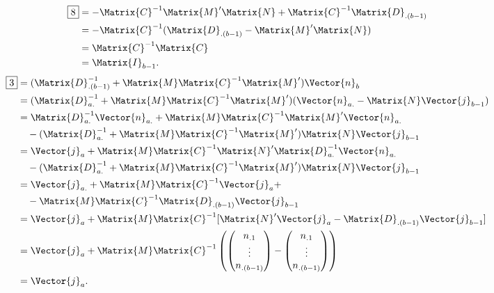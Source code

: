 \begin{align*}
    \boxed{8}
     & =-\Matrix{C}^{-1}\Matrix{M}'\Matrix{N}+\Matrix{C}^{-1}\Matrix{D}_{.(b-1)} \\
     & =-\Matrix{C}^{-1}(\Matrix{D}_{.(b-1)}-\Matrix{M}'\Matrix{N})              \\
     & =\Matrix{C}^{-1}\Matrix{C}                                                \\
     & =\Matrix{I}_{b-1}.
\end{align*}
\begin{align*}
    \boxed{3}
     & =(\Matrix{D}_{.(b-1)}^{-1}+\Matrix{M}\Matrix{C}^{-1}\Matrix{M}')\Vector{n}_{b}                           \\
     & =(\Matrix{D}_{a.}^{-1}+\Matrix{M}\Matrix{C}^{-1}\Matrix{M}')(\Vector{n}_{a.}-\Matrix{N}\Vector{j}_{b-1}) \\
     & =\Matrix{D}_{a.}^{-1}\Vector{n}_{a.}+\Matrix{M}\Matrix{C}^{-1}\Matrix{M}'\Vector{n}_{a.}                 \\
     & \quad-(\Matrix{D}_{a.}^{-1}+\Matrix{M}\Matrix{C}^{-1}\Matrix{M}')\Matrix{N}\Vector{j}_{b-1}              \\
     & =\Vector{j}_a+\Matrix{M}\Matrix{C}^{-1}\Matrix{N}'\Matrix{D}_{a.}^{-1}\Vector{n}_{a.}                    \\
     & \quad-(\Matrix{D}_{a.}^{-1}+\Matrix{M}\Matrix{C}^{-1}\Matrix{M}')\Matrix{N}\Vector{j}_{b-1}              \\
     & =\Vector{j}_{a.}+\Matrix{M}\Matrix{C}^{-1}\Vector{j}_a+                                                  \\
     & \quad-\Matrix{M}\Matrix{C}^{-1}\Matrix{D}_{.(b-1)}\Vector{j}_{b-1}                                       \\
     & =\Vector{j}_a+\Matrix{M}\Matrix{C}^{-1}[\Matrix{N}'\Vector{j}_a-\Matrix{D}_{.(b-1)}\Vector{j}_{b-1}]     \\
     & =\Vector{j}_a+\Matrix{M}\Matrix{C}^{-1}\left(\begin{pmatrix}
                                                            n_{.1} \\
                                                            \vdots \\
                                                            n_{.(b-1)}
                                                        \end{pmatrix}-\begin{pmatrix}
                                                                          n_{.1} \\
                                                                          \vdots \\
                                                                          n_{.(b-1)}
                                                                      \end{pmatrix}\right)                          \\
     & =\Vector{j}_a.
\end{align*}
